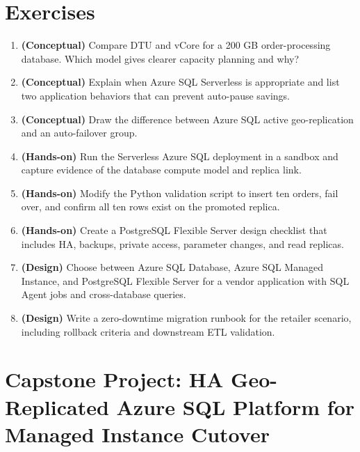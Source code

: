 \section{Exercises}
\begin{enumerate}
    \item \textbf{(Conceptual)} Compare DTU and vCore for a 200 GB order-processing database. Which model gives clearer capacity planning and why?
    \item \textbf{(Conceptual)} Explain when Azure SQL Serverless is appropriate and list two application behaviors that can prevent auto-pause savings.
    \item \textbf{(Conceptual)} Draw the difference between Azure SQL active geo-replication and an auto-failover group.
    \item \textbf{(Hands-on)} Run the Serverless Azure SQL deployment in a sandbox and capture evidence of the database compute model and replica link.
    \item \textbf{(Hands-on)} Modify the Python validation script to insert ten orders, fail over, and confirm all ten rows exist on the promoted replica.
    \item \textbf{(Hands-on)} Create a PostgreSQL Flexible Server design checklist that includes HA, backups, private access, parameter changes, and read replicas.
    \item \textbf{(Design)} Choose between Azure SQL Database, Azure SQL Managed Instance, and PostgreSQL Flexible Server for a vendor application with SQL Agent jobs and cross-database queries.
    \item \textbf{(Design)} Write a zero-downtime migration runbook for the retailer scenario, including rollback criteria and downstream ETL validation.
\end{enumerate}

\section{Capstone Project: HA Geo-Replicated Azure SQL Platform for Managed Instance Cutover}\label{sec:ch2-capstone}


